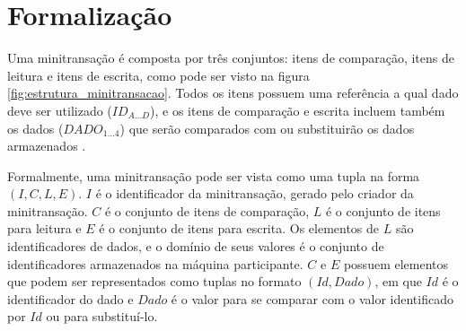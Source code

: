 \documentclass[11pt,twoside,a4paper]{book}
\begin{document}
\section{Formalização}
\label{sec:formalizacao}
Uma minitransação é composta por três conjuntos: itens de comparação, itens de leitura e itens de escrita, como pode ser visto na figura \ref{fig:estrutura_minitransacao}. Todos os itens possuem uma referência a qual dado deve ser utilizado ($ID_{A...D}$), e os itens de comparação e escrita incluem também os dados ($DADO_{1...4}$) que serão comparados com ou substituirão os dados armazenados \cite{sinfonia}. 


Formalmente, uma minitransação pode ser vista como uma tupla na forma $(I, C, L, E)$. $I$ é o identificador da minitransação, gerado pelo criador da minitransação. \(C\) é o conjunto de itens de comparação, \(L\) é o conjunto de itens para leitura e \(E\) é o conjunto de itens para escrita. Os elementos de \(L\) são identificadores de dados, e o domínio de seus valores é o conjunto de identificadores armazenados na máquina participante. \(C\) e \(E\) possuem elementos que podem ser representados como tuplas no formato \((Id, Dado)\), em que \(Id\) é o identificador do dado e \(Dado\) é o valor para se comparar com o valor identificado por $Id$ ou para substituí-lo.






\end{document}
